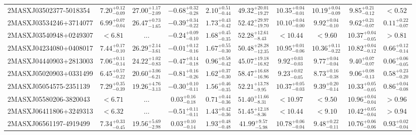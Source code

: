 \documentclass[onecolumn]{mn2e}
\begin{document}
\begin{landscape}
{\begin{center}
\begin{longtable}{lccccccccc}
2MASXJ03502377-5018354 & $7.20_{-0.09}^{+0.12}$ & $27.00_{-2.09}^{+1.17}$ & $-0.68_{-0.28}^{+0.32}$ & $2.10_{-0.44}^{+0.51}$ &$49.32_{-19.27}^{+20.01}$ & $10.35_{-0.01}^{+0.04}$ & $10.19_{-0.09}^{+0.04}$ & $9.85_{-0.12}^{+0.21}$ & $<0.52$ \\
2MASXJ03534246+3714077 & $6.99_{-0.04}^{+0.07}$ & $26.47_{-1.65}^{+0.73}$ & $-0.39_{-0.22}^{+0.34}$ & $1.73_{-0.42}^{+0.43}$ &$52.42_{-19.70}^{+29.97}$ & $10.10_{-0.00}^{+0.04}$ & $9.92_{-0.10}^{+0.04}$ & $9.62_{-0.07}^{+0.21}$ & $0.11_{-0.07}^{+0.22}$ \\
2MASXJ03540948+0249307 & $<6.81$ & ... & $-0.24_{-0.10}^{+0.09}$ & $1.68_{-0.35}^{+0.45}$ &$52.28_{-8.43}^{+12.61}$ & $<10.44$ & $<9.60$ & $10.37_{-0.05}^{+0.04}$ & $>0.81$ \\
2MASXJ04234080+0408017 & $7.44_{-0.10}^{+0.17}$ & $26.29_{-3.61}^{+2.14}$ & $-0.01_{-0.16}^{+0.12}$ & $1.67_{-0.30}^{+0.55}$ &$50.48_{-12.35}^{+28.28}$ & $10.95_{-0.06}^{+0.01}$ & $10.36_{-0.22}^{+0.11}$ & $10.82_{-0.12}^{+0.04}$ & $0.66_{-0.14}^{+0.12}$ \\
2MASXJ04440903+2813003 & $7.06_{-0.14}^{+0.11}$ & $24.22_{-0.83}^{+1.02}$ & $-0.47_{-0.18}^{+0.14}$ & $0.96_{-0.42}^{+0.58}$ &$45.07_{-16.82}^{+19.18}$ & $9.92_{-0.03}^{+0.03}$ & $9.77_{-0.04}^{+0.04}$ & $9.40_{-0.07}^{+0.07}$ & $0.06_{-0.05}^{+0.06}$ \\
2MASXJ05020903+0331499 & $6.45_{-0.22}^{+0.57}$ & $20.60_{-6.21}^{+3.06}$ & $-0.81_{-0.26}^{+0.16}$ & $1.62_{-0.30}^{+0.37}$ &$58.47_{-16.96}^{+16.68}$ & $9.23_{-0.05}^{+0.02}$ & $8.73_{-0.38}^{+0.16}$ & $9.06_{-0.13}^{+0.08}$ & $0.58_{-0.20}^{+0.23}$ \\
2MASXJ05054575-2351139 & $7.29_{-0.39}^{+0.35}$ & $19.26_{-3.13}^{+4.76}$ & $-0.30_{-0.11}^{+0.10}$ & $1.56_{-0.35}^{+0.46}$ &$52.21_{-9.95}^{+13.78}$ & $10.37_{-0.03}^{+0.05}$ & $9.39_{-0.14}^{+0.20}$ & $10.33_{-0.05}^{+0.05}$ & $0.86_{-0.08}^{+0.04}$ \\
2MASXJ05580206-3820043 & $<6.71$ & ... & $0.03_{-0.18}^{+0.16}$ & $0.71_{-0.36}^{+0.44}$ &$51.40_{-8.31}^{+11.66}$ & $<10.97$ & $<9.50$ & $10.96_{-0.04}^{+0.04}$ & $>0.96$ \\
2MASXJ06411806+3249313 & $<6.32$ & ... & $-0.51_{-0.11}^{+0.11}$ & $1.43_{-0.36}^{+0.42}$ &$51.45_{-8.36}^{+12.18}$ & $<10.44$ & $<9.10$ & $10.42_{-0.04}^{+0.05}$ & $>0.94$ \\
2MASXJ06561197-4919499 & $7.34_{-0.45}^{+0.33}$ & $19.56_{-2.98}^{+5.69}$ & $0.03_{-0.14}^{+0.10}$ & $1.93_{-0.48}^{+0.48}$ &$41.99_{-5.98}^{+9.57}$ & $10.78_{-0.04}^{+0.06}$ & $9.48_{-0.11}^{+0.22}$ & $10.76_{-0.06}^{+0.06}$ & $0.93_{-0.04}^{+0.02}$ \\

\end{longtable}
\end{center}}
\end{landscape}
\end{document}
